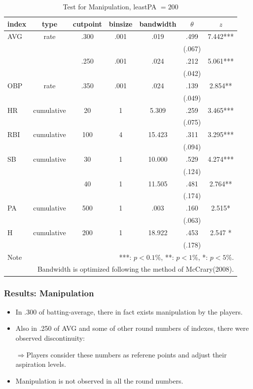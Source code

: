 \documentclass[dvipdfmx,12pt]{beamer}
\begin{document}
\begin{frame}
  \begin{table}
    \tiny
    \centering
    \caption{Test for Manipulation, leastPA $= 200$}
    \begin{tabular}{lcccccc}\hline
      index & type & cutpoint & binsize & bandwidth & $\theta$ & $z$
      \\ \hline \hline
      AVG & rate & .300 & .001 & .019 &  .499 & 7.442*** \\
      & & & & & (.067) & \\
      & & .250 & .001 & .024 & .212 & 5.061*** \\
      & & & & & (.042) & \\
      OBP & rate & .350 & .001 & .024 &  .139 & 2.854** \\
      & & & & & (.049) &  \\
      HR & cumulative & 20 & 1 & 5.309 & .259 & 3.465*** \\
      & & & & & (.075)  & \\
      RBI & cumulative & 100 & 4 & 15.423 & .311 & 3.295*** \\
      & & & & & (.094) & \\
      SB & cumulative & 30 & 1 & 10.000 & .529 & 4.274*** \\
      & & & & & (.124) & \\
      & & 40 & 1 & 11.505 & .481 & 2.764** \\
      & & & & & (.174) & \\
      PA & cumulative & 500 & 1 & .003 & .160 & 2.515* \\
      & & & & &(.063) & \\
      H & cumulative & 200 & 1 & 18.922 & .453 & 2.547 * \\
      & & & & & (.178) & \\ \hline \hline
      Note & \multicolumn{6}{r}{
      ***: $p<0.1\%$, **: $p<1\%$, *: $p<5\%$.
      }\\
      \multicolumn{7}{r}{
      Bandwidth is optimized following the method of McCrary(2008).
      }
    \end{tabular}
    \label{Bunch-True}
  \end{table}
\end{frame}

\begin{frame}\frametitle{Results: Manipulation}
  \begin{itemize}
    \item In .300 of batting-average, there in fact exists manipulation by the players.

    \item Also in .250 of AVG and some of other round numbers of indexes, there were observed discontinuity:

    $\Rightarrow$Players consider these numbers as referene points and adjust their aspiration levels.

    \item Manipulation is not observed in all the round numbers.

  \end{itemize}
\end{frame}
\end{document}
